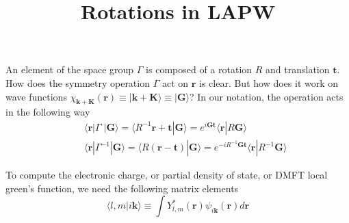 \documentclass[aps,prb,floatfix,epsfig,twocolumn,showpacs,preprintnumbers]{revtex4}
\renewcommand{\vr}{{\mathbf{r}}}
\newcommand{\vt}{{\mathbf{t}}}
\newcommand{\vG}{{\mathbf{G}}}
\newcommand{\vk}{{\mathbf{k}}}
\newcommand{\vK}{{\mathbf{K}}}
\begin{document}
\title{Rotations in LAPW}
\maketitle



An element of the space group $\Gamma$ is composed of a rotation $R$
and translation $\vt$. How does the symmetry operation $\Gamma$ act on
$\vr$ is clear. But how does it work on wave functions
$\chi_{\vk+\vK}(\vr)\equiv |\vk+\vK\rangle \equiv |\vG\rangle$? In our
notation, the operation acts in the following way
\begin{eqnarray}
&& \langle \vr |\Gamma\;|\vG\rangle =   \langle R^{-1}\vr +\vt|\vG\rangle =
e^{i\vG \vt}\langle \vr|R\vG\rangle\\
&& \langle \vr |\Gamma^{-1}|\vG\rangle =   \langle R(\vr -\vt)|\vG\rangle =
e^{-i R^{-1} \vG \vt}\langle \vr|R^{-1}\vG\rangle
\end{eqnarray}

To compute the electronic charge, or partial density of state, or DMFT
local green's function, we need the following matrix elements
\begin{equation}
\langle l,m| i\vk\rangle \equiv  \int Y^*_{l,m}(\vr) \psi_{i\vk}(\vr) d\vr
\end{equation}
\end{document}
